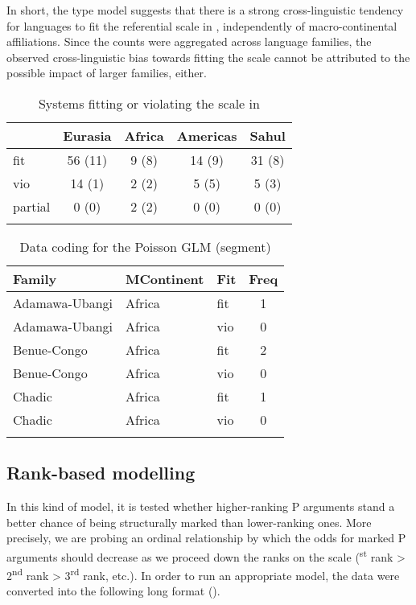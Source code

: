 \documentclass[output=paper]{langscibook}
\begin{document}
 

In short, the type model suggests that there is a strong cross-linguistic tendency for languages to fit the referential scale in , independently of macro-continental affiliations. Since the counts were aggregated across language families, the observed cross-linguistic bias towards fitting the scale cannot be attributed to the possible impact of larger families, either.

\begin{table}[t]
\caption{Systems fitting or violating the scale in }
\label{18-sc-tab:11}
\begin{tabularx}{.8\textwidth}{XSSSS}
\lsptoprule
& \bfseries Eurasia & \bfseries Africa & \bfseries Americas & \bfseries Sahul\\
\midrule 
fit & 56 (11) & 9 (8) & 14 (9) & 31 (8)\\
vio & 14 (1) & 2  (2)& 5 (5) & 5  (3)\\
partial & 0 (0) & 2  (2)& 0 (0) & 0 (0)\\
\lspbottomrule
\end{tabularx}
\end{table}

\begin{table}
\caption{Data coding for the Poisson GLM (segment)}
\label{18-sc-tab:12}
\begin{tabularx}{.8\textwidth}{lXXS}
\lsptoprule
\bfseries Family & \bfseries MContinent & \bfseries Fit & \bfseries Freq\\
\midrule
Adamawa-Ubangi & Africa & fit & 1\\
Adamawa-Ubangi & Africa & vio & 0\\
Benue-Congo & Africa & fit & 2\\
Benue-Congo & Africa & vio & 0\\
Chadic & Africa & fit & 1\\
Chadic & Africa & vio & 0\\
\lspbottomrule
\end{tabularx}
\end{table}

\largerpage 
\subsection{Rank-based modelling}
\label{18-sc-subsec:3-2}

In this kind of model, it is tested whether higher-ranking P arguments stand a better chance of being structurally marked than lower-ranking ones. More precisely, we are probing an ordinal relationship by which the odds for marked P arguments should decrease as we proceed down the ranks on the scale (\textsuperscript{st} rank > 2\textsuperscript{nd} rank > 3\textsuperscript{rd} rank, etc.). In order to run an appropriate model, the data were converted into the following long format ().
\end{document}
